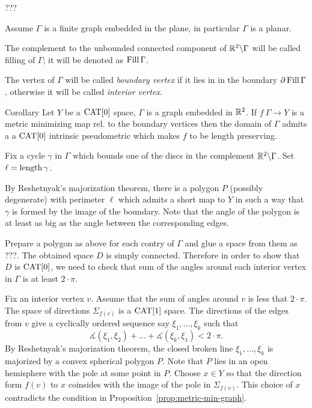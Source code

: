 \documentclass[a4paper,10pt]{amsart}
\begin{document}
???\qeds

Assume $\Gamma$ is a finite graph embedded in the plane,
in particular $\Gamma$ is a planar.

The complement to the unbounded connected component of $\mathbb{R}^2\backslash\Gamma$ will be called filling of $\Gamma$;
it will be denoted as $\mathop{\rm Fill}\Gamma$.

The vertex of $\Gamma$ will be called \emph{boundary vertex}
if it lies in in the boundary $\partial\mathop{\rm Fill}\Gamma$,
otherwise it will be called \emph{interior vertex}.

\begin{thm}{Corollary}
Let $Y$ be a $\mathop{\rm CAT}\nolimits[0]$ space,
$\Gamma$ is a graph embedded in $\mathbb{R}^2$.
If $f\:\Gamma\to Y$ is a metric minimizing map rel. to the boundary vertices 
then the domain of $\Gamma$ admits a 
a $\mathop{\rm CAT}\nolimits[0]$ intrinsic pseudometric which makes $f$ to be length preserving.
\end{thm}

Fix a cycle $\gamma$ in $\Gamma$ which bounds one of the discs in the complement $\mathbb{R}^2\backslash \Gamma$.
Set $\ell=\mathop{\rm length}\nolimits\gamma$.

By Reshetnyak's majorization theorem, there is a polygon $P$ (possibly degenerate) with perimeter $\ell$ which admits a short map to $Y$ in such a way that $\gamma$ is formed by the image of the boundary.
Note that the angle of the polygon is at least as big as the angle between the corresponding edges.

Prepare a polygon as above for each contry of $\Gamma$
and glue a space from them as ???.
The obtained space $D$ is simply connected.
Therefore in order to show that $D$ is $\mathop{\rm CAT}\nolimits[0]$,
we need to check that sum of the angles around each interior vertex in $\Gamma$ is at least $2\cdot\pi$.

Fix an interior vertex $v$.
Assume that the sum of angles around $v$ is less that $2\cdot\pi$.
The space of directions $\Sigma_{f(v)}$ is a $\mathop{\rm CAT}\nolimits[1]$ space.
The directions of the edges from $v$ give a cyclically ordered sequence say $\xi_1,\dots,\xi_k$
such that
\[\measuredangle(\xi_1,\xi_2)+\dots+\measuredangle(\xi_k,\xi_1)<2\cdot\pi.\]
By Reshetnyak's majorization theorem,
the closed broken line $\xi_1,\dots,\xi_k$ is majorized by a convex spherical polygon $P$.
Note that $P$ lies in an open hemisphere with the pole  at some point in $P$.
Choose $x\in Y$ so that the direction form $f(v)$ to $x$ coinsides with the image of the pole in $\Sigma_{f(v)}$.
This choice of $x$ contradicts the condition in Proposition~\ref{prop:metric-min-graph}.\qeds
\end{document}
